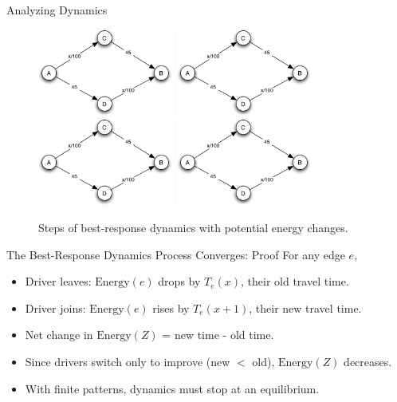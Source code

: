 \documentclass[10pt]{beamer}
\begin{document}
\begin{frame}{Analyzing Dynamics}
  \begin{figure}[h]
    \centering
    \onslide<+->
    \includegraphics[width=0.4\textwidth,page=6]{fig/note02/braess.pdf}
    \onslide<+->
    \includegraphics[width=0.4\textwidth,page=7]{fig/note02/braess.pdf}
    \onslide<+->
    \includegraphics[width=0.4\textwidth,page=8]{fig/note02/braess.pdf}
    \onslide<+->
    \includegraphics[width=0.4\textwidth,page=9]{fig/note02/braess.pdf}
    \onslide<+->
    \caption{Steps of best-response dynamics with potential energy changes.}
    \label{fig:dynamics}
  \end{figure}
\end{frame}

\begin{frame}{The Best-Response Dynamics Process Converges: Proof}
  For any edge \( e \),
  \begin{itemize}[<+->]
    \item Driver leaves: \( \text{Energy}(e) \) drops by \( T_e(x) \), their old travel time.
    \item Driver joins: \( \text{Energy}(e) \) rises by \( T_e(x+1) \), their new travel time.
    \item Net change in \( \text{Energy}(Z) \) = new time - old time. 
    \item Since drivers switch only to improve (new $<$ old), \( \text{Energy}(Z) \) decreases.
    \item With finite patterns, dynamics must stop at an equilibrium.
  \end{itemize}
\end{frame}
\end{document}
